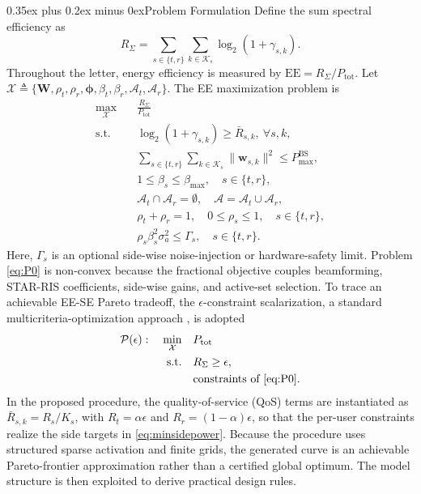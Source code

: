 \documentclass[journal]{IEEEtran}
\makeatletter
\def\section{\@startsection{section}{1}{\z@}{1.2ex plus 0.4ex minus 0.2ex}%
{0.35ex plus 0.2ex minus 0ex}{\normalfont\normalsize\centering\scshape}}%
\makeatother
\begin{document}
\section{Problem Formulation}
Define the sum spectral efficiency as
\begin{equation}
R_\Sigma=\sum_{s\in\{t,r\}}\sum_{k\in\mathcal{K}_s}\log_2(1+\gamma_{s,k}).
\label{eq:sumrate}
\end{equation}
Throughout the letter, energy efficiency is measured by $\mathrm{EE}=R_\Sigma/P_{\mathrm{tot}}$. Let $\mathcal X\triangleq\{\mathbf W,\rho_t,\rho_r,\bm\phi,\beta_t,\beta_r,\mathcal A_t,\mathcal A_r\}$. The EE maximization problem is
\begin{equation}
\begin{aligned}
\max_{\mathcal X}
\quad & \frac{R_\Sigma}{P_{\mathrm{tot}}} \\
\text{s.t.}\quad &
\log_2(1+\gamma_{s,k})\ge \bar{R}_{s,k},\ \forall s,k, \\
&
\sum_{s\in\{t,r\}}\sum_{k\in\mathcal{K}_s}\|\mathbf{w}_{s,k}\|^2 \le P_{\max}^{\mathrm{BS}},\\
&
1\le \beta_s\le \beta_{\max},\quad s\in\{t,r\},\\
&
\mathcal{A}_t\cap\mathcal{A}_r=\emptyset,\quad \mathcal{A}=\mathcal{A}_t\cup\mathcal{A}_r,\\
&
\rho_t+\rho_r=1,\quad 0\le \rho_s\le 1,\quad s\in\{t,r\},\\
&
\rho_s\beta_s^2\sigma_a^2 \le \Gamma_s,\quad s\in\{t,r\}.
\end{aligned}
\label{eq:P0}
\end{equation}
Here, $\Gamma_s$ is an optional side-wise noise-injection or hardware-safety limit. Problem \eqref{eq:P0} is non-convex because the fractional objective couples beamforming, STAR-RIS coefficients, side-wise gains, and active-set selection. To trace an achievable EE-SE Pareto tradeoff, the $\epsilon$-constraint scalarization, a standard multicriteria-optimization approach \cite{ehrgott2005multicriteria}, is adopted
\begin{equation}
\begin{aligned}
\mathcal{P}(\epsilon):\quad
\min_{\mathcal X}
\quad & P_{\mathrm{tot}} \\
\text{s.t.}\quad &
R_\Sigma \ge \epsilon, \\
& \text{constraints of \eqref{eq:P0}.}
\end{aligned}
\label{eq:epsilon}
\end{equation}
In the proposed procedure, the quality-of-service (QoS) terms are instantiated as $\bar R_{s,k}=R_s/K_s$, with $R_t=\alpha\epsilon$ and $R_r=(1-\alpha)\epsilon$, so that the per-user constraints realize the side targets in \eqref{eq:minsidepower}. Because the procedure uses structured sparse activation and finite grids, the generated curve is an achievable Pareto-frontier approximation rather than a certified global optimum. The model structure is then exploited to derive practical design rules.
\end{document}
